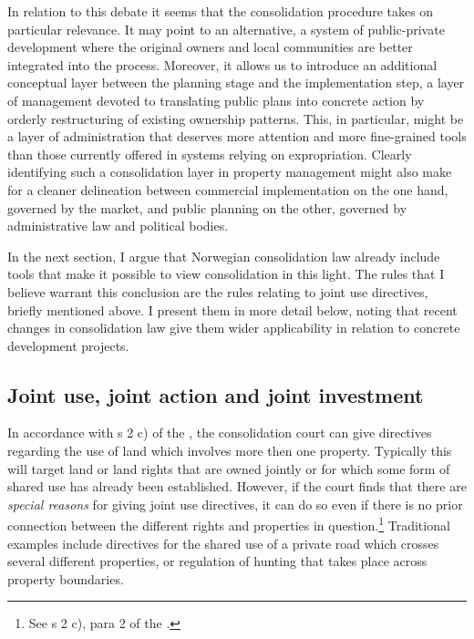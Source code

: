 In relation to this debate it seems that the consolidation procedure takes on particular relevance. It may point to an alternative, a system of public-private development where the original owners and local communities are better integrated into the process. Moreover, it allows us to introduce an additional conceptual layer between the planning stage and the implementation step, a layer of management devoted to translating public plans into concrete action by orderly restructuring of existing ownership patterns. This, in particular, might be a layer of administration that deserves more attention and more fine-grained tools than those currently offered in systems relying on expropriation. Clearly identifying such a consolidation layer in property management might also make for a cleaner delineation between commercial implementation on the one hand, governed by the market, and public planning on the other, governed by administrative law and political bodies. 

In the next section, I argue that Norwegian consolidation law already include tools that make it possible to view consolidation in this light. The rules that I believe warrant this conclusion are the rules relating to joint use directives, briefly mentioned above. I present them in more detail below, noting that recent changes in consolidation law give them wider applicability in relation to concrete development projects. 

\subsection{Joint use, joint action and joint investment}\label{sec:3}

In accordance with s 2 c) of the \cite{lca79}, the consolidation court can give directives regarding the use of land which involves more then one property. Typically this will target land or land rights that are owned jointly or for which some form of shared use has already been established. However, if the court finds that there are \emph{special reasons} for giving joint use directives, it can do so even if there is no prior connection between the different rights and properties in question.\footnote{See s 2 c), para 2 of the \cite{lca79}.} Traditional examples include directives for the shared use of a private road which crosses several different properties, or regulation of hunting that takes place across property boundaries.

